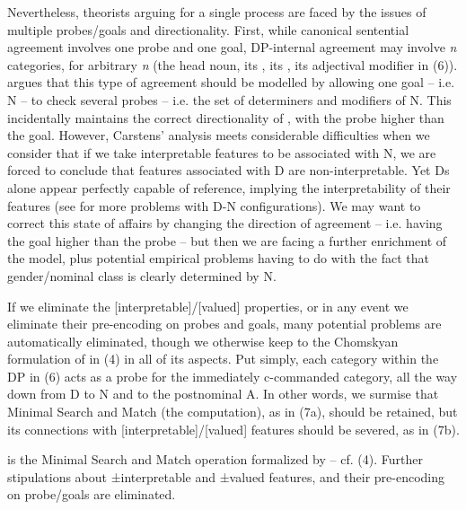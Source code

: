 \documentclass[output=paper]{langsci/langscibook}
\begin{document}
Nevertheless, theorists arguing for a single  process are faced by the issues of multiple probes\slash goals and directionality. First, while canonical sentential agreement involves one probe and one goal, DP-internal agreement may involve \textit{n} categories, for arbitrary \textit{n} (the head noun, its , its , its adjectival modifier in (6)). \citet{Carstens2001} argues that this type of agreement should be modelled by allowing one goal – i.e. N – to check several probes – i.e. the set of determiners and modifiers of N. This incidentally maintains the correct directionality of , with the probe higher than the goal. However, Carstens’ analysis meets considerable difficulties when we consider that if we take interpretable features to be associated with N, we are forced to conclude that features associated with D are non-interpretable. Yet Ds alone appear perfectly capable of reference, implying the interpretability of their features (see \citealt{Danon2010} for more problems with D-N configurations). We may want to correct this state of affairs by changing the direction of agreement – i.e. having the goal higher than the probe – but then we are facing a further enrichment of the model, plus potential empirical problems having to do with the fact that gender\slash nominal class is clearly determined by N.

If we eliminate the [interpretable]/[valued] properties, or in any event we eliminate their pre-encoding on probes and goals, many potential problems are automatically eliminated, though we otherwise keep to the Chomskyan formulation of  in (4) in all of its aspects. Put simply, each category within the DP in (6) acts as a probe for the immediately c-commanded category, all the way down from D to N and to the postnominal A. In other words, we surmise that Minimal Search and Match (the  computation), as in (7a), should be retained, but its connections with [interpretable]/[valued] features should be severed, as in (7b). 

\ea%
    \label{ex:manzini:7}
    \ea {} is the Minimal Search and Match operation formalized by \citet{Chomsky2000} – cf. (4). 
    \ex Further stipulations about ±interpretable and ±valued features, and their pre-encoding on probe\slash goals \citep{Chomsky2001Derivation} are eliminated.  
    \z
\z
\end{document}
